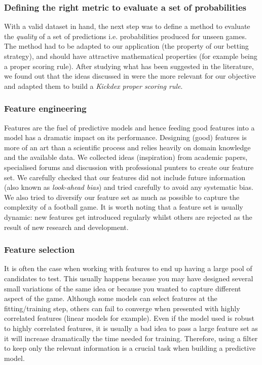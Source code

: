 \documentclass[11pt]{article}
\begin{document}
\subsubsection{Defining the right metric to evaluate a set of probabilities}
\label{sec:org4d4c345}
With a valid dataset in hand, the next step was to define a method to
evaluate the \emph{quality} of a set of predictions i.e. probabilities produced
for unseen games. The method had to be adapted to our application (the
property of our betting strategy), and should have attractive mathematical
properties (for example being a proper scoring rule). After studying what
has been suggested in the literature, we found out that the ideas discussed
in \cite{johnstone11_tailor_scorin_rules_probab} were the more relevant for
our objective and adapted them to build a \emph{Kickdex proper scoring rule}.
\subsubsection{Feature engineering}
\label{sec:orgb175000}
Features are the fuel of predictive models and hence feeding good features
into a model has a dramatic impact on its performance. Designing (good)
features is more of an art than a scientific process and relies heavily on
domain knowledge and the available data. We collected ideas (inspiration)
from academic papers, specialised forums and discussion with professional
punters to create our feature set. We carefully checked that our features
did not include future information (also known as \emph{look-ahead bias}) and
tried carefully to avoid any systematic bias. We also tried to diversify our
feature set as much as possible to capture the complexity of a football
game. It is worth noting that a feature set is usually dynamic: new features
get introduced regularly whilst others are rejected as the result of new
research and development.

\subsubsection{Feature selection}
\label{sec:org444d6b9}
It is often the case when working with features to end up having a large
pool of candidates to test. This usually happens because you may have
designed several small variations of the same idea or because you wanted to
capture different aspect of the game. Although some models can select
features at the fitting/training step, others can fail to converge when
presented with highly correlated features (linear models for example). Even
if the model used is robust to highly correlated features, it is usually a
bad idea to pass a large feature set as it will increase dramatically the
time needed for training. Therefore, using a filter to keep only the
relevant information is a crucial task when building a predictive model.
\end{document}
